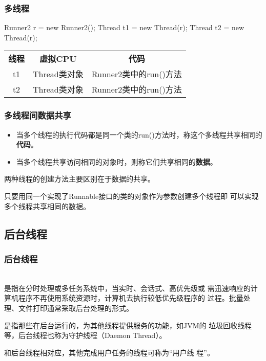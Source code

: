 \begin{frame}[fragile] %
  \frametitle{多线程}


  \begin{javaCode}
    Runner2 r = new Runner2();
    Thread t1 = new Thread(r);
    Thread t2 = new Thread(r);
  \end{javaCode}
  \begin{table}
    \footnotesize
    \setlength{\extrarowheight}{1.2mm}
    \begin{tabular}{c|c|c}
      {\bf 线程} & {\bf 虚拟CPU} & {\bf 代码} \\
      t1 & Thread类对象 & Runner2类中的run()方法 \\
      t2 & Thread类对象 & Runner2类中的run()方法 \\
    \end{tabular}
  \end{table}
\end{frame}

\begin{frame}[fragile]
  \frametitle{多线程间数据共享}

  \begin{itemize}
  \item 当多个线程的执行代码都是同一个类的run()方法时，称这个多线程共享相同的{\bf\Red 代码}。
  \item 当多个线程共享访问相同的对象时，则称它们共享相同的{\bf\Red 数据}。    
  \end{itemize}

  \pause
  
  两种线程的创建方法主要区别在于{\hei\Blue 数据的共享}。

  {\kai 只要用同一个实现了Runnable接口的类的对象作为参数创建多个线程即
    可以实现多个线程共享相同的数据。}

\end{frame}



\subsection{后台线程}

\begin{frame}[fragile] %
  \frametitle{后台线程}

  \\
   是指在分时处理或多任务系统中，当实时、会话式、高优先级或
  需迅速响应的计算机程序不再使用系统资源时，计算机去执行较低优先级程序的
  过程。批量处理、文件打印通常采取后台处理的形式。\pause

   是指那些在后台运行的，为其他线程提供服务的功能，如JVM的
  垃圾回收线程等，后台线程也称为守护线程（Daemon Thread）。\pause

   和后台线程相对应，其他完成用户任务的线程可称为“用户线
  程”。
\end{frame}

